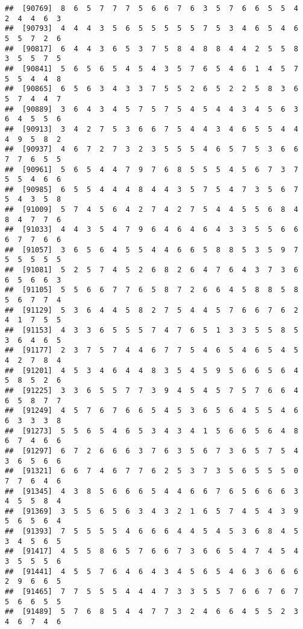 \documentclass[
]{book}
\begin{document}
\begin{verbatim}
##  [90769]  8  6  5  7  7  7  5  6  6  7  6  3  5  7  6  6  5  5  4  2  4  4  6  3
##  [90793]  4  4  4  3  5  6  5  5  5  5  5  7  5  3  4  6  5  4  6  5  5  7  2  6
##  [90817]  6  4  4  3  6  5  3  7  5  8  4  8  8  4  4  2  5  5  8  3  5  5  7  5
##  [90841]  5  6  5  6  5  4  5  4  3  5  7  6  5  4  6  1  4  5  7  5  5  4  4  8
##  [90865]  6  5  6  3  4  3  3  7  5  5  2  6  5  2  2  5  8  3  6  5  7  4  4  7
##  [90889]  3  6  4  3  4  5  7  5  7  5  4  5  4  4  3  4  5  6  3  6  4  5  5  6
##  [90913]  3  4  2  7  5  3  6  6  7  5  4  4  3  4  6  5  5  4  4  4  9  5  8  2
##  [90937]  4  6  7  2  7  3  2  3  5  5  5  4  6  5  7  5  3  6  6  7  7  6  5  5
##  [90961]  5  6  5  4  4  7  9  7  6  8  5  5  5  4  5  6  7  3  7  5  5  4  6  6
##  [90985]  6  5  5  4  4  4  8  4  4  3  5  7  5  4  7  3  5  6  7  5  4  3  5  8
##  [91009]  5  7  4  5  6  4  2  7  4  2  7  5  4  4  5  5  6  8  4  8  4  7  7  6
##  [91033]  4  4  3  5  4  7  9  6  4  6  4  6  4  3  3  5  5  6  6  6  7  7  6  6
##  [91057]  3  6  5  6  4  5  5  4  4  6  6  5  8  8  5  3  5  9  7  5  5  5  5  5
##  [91081]  5  2  5  7  4  5  2  6  8  2  6  4  7  6  4  3  7  3  6  6  5  6  6  3
##  [91105]  5  5  6  6  7  7  6  5  8  7  2  6  6  4  5  8  8  5  8  5  6  7  7  4
##  [91129]  5  3  6  4  4  5  8  2  7  5  4  4  5  7  6  6  7  6  2  4  1  7  5  5
##  [91153]  4  3  3  6  5  5  5  7  4  7  6  5  1  3  3  5  5  8  5  3  6  4  6  5
##  [91177]  2  3  7  5  7  4  4  6  7  7  5  4  6  5  4  6  5  4  5  4  2  7  8  4
##  [91201]  4  5  3  4  6  4  4  8  3  5  4  5  9  5  6  6  5  6  4  5  8  5  2  6
##  [91225]  3  3  6  5  5  7  7  3  9  4  5  4  5  7  5  7  6  6  4  6  5  8  7  7
##  [91249]  4  5  7  6  7  6  6  5  4  5  3  6  5  6  4  5  5  4  6  6  3  3  3  8
##  [91273]  5  5  6  5  4  6  5  3  4  3  4  1  5  6  6  5  6  4  8  6  7  4  6  6
##  [91297]  6  7  2  6  6  6  3  7  6  3  5  6  7  3  6  5  7  5  4  3  6  5  6  6
##  [91321]  6  6  7  4  6  7  7  6  2  5  3  7  3  5  6  5  5  5  0  7  7  6  4  6
##  [91345]  4  3  8  5  6  6  6  5  4  4  6  6  7  6  5  6  6  6  3  4  5  5  8  4
##  [91369]  3  5  5  6  5  6  3  4  3  2  1  6  5  7  4  5  4  3  9  5  6  5  6  4
##  [91393]  7  5  5  5  5  4  6  6  6  4  4  5  4  5  3  6  8  4  5  3  4  5  6  5
##  [91417]  4  5  5  8  6  5  7  6  6  7  3  6  6  5  4  7  4  5  4  3  5  5  5  6
##  [91441]  4  5  5  7  6  4  6  4  3  4  5  6  5  4  6  3  6  6  6  2  9  6  6  5
##  [91465]  7  7  5  5  5  4  4  4  7  3  3  5  5  7  6  6  7  6  7  5  6  6  5  5
##  [91489]  5  7  6  8  5  4  4  7  7  3  2  4  6  6  4  5  5  2  3  4  6  7  4  6

\end{verbatim}
\end{document}
